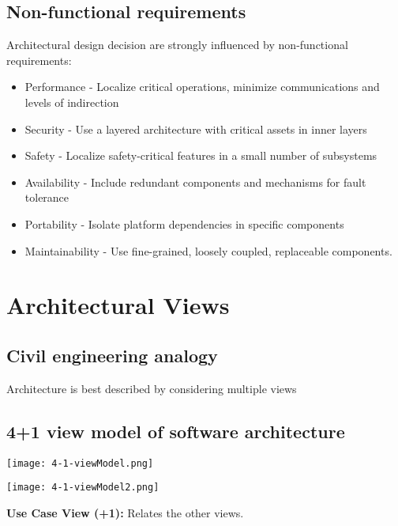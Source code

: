 \documentclass[../ESOF_notes.tex]{subfiles}
\begin{document}
\subsection{Non-functional requirements}
Architectural design decision are strongly influenced by non-functional requirements:
\begin{itemize}
    \item Performance - Localize critical operations, minimize communications and levels of indirection
    \item Security - Use a layered architecture with critical assets in inner layers
    \item Safety - Localize safety-critical features in a small number of subsystems
    \item Availability - Include redundant components and mechanisms for fault tolerance
    \item Portability - Isolate platform dependencies in specific components
    \item Maintainability - Use fine-grained, loosely coupled, replaceable components.
\end{itemize}

\section{Architectural Views}

\subsection{Civil engineering analogy}
Architecture is best described by considering multiple views

\subsection{4+1 view model of software architecture}
    \begin{center}
        \texttt{[image: 4-1-viewModel.png]}
    \end{center}
    \begin{center}
        \texttt{[image: 4-1-viewModel2.png]}
    \end{center}
    \textbf{Use Case View (+1):} Relates the other views.
\end{document}
